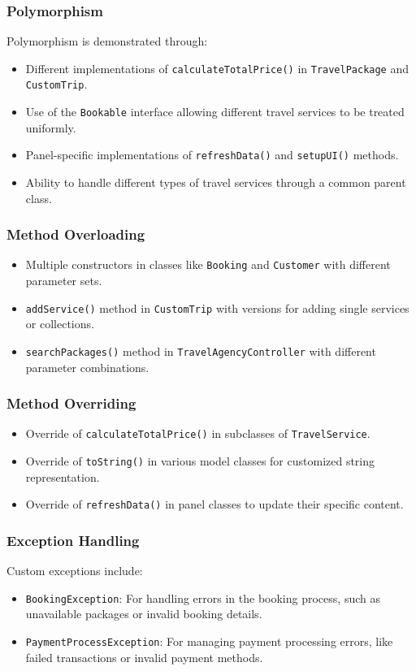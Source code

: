 \documentclass[12pt]{article}
\begin{document}
\subsubsection{Polymorphism}
Polymorphism is demonstrated through:
\begin{itemize}
    \item Different implementations of \texttt{calculateTotalPrice()} in \texttt{TravelPackage} and \texttt{CustomTrip}.
    \item Use of the \texttt{Bookable} interface allowing different travel services to be treated uniformly.
    \item Panel-specific implementations of \texttt{refreshData()} and \texttt{setupUI()} methods.
    \item Ability to handle different types of travel services through a common parent class.
\end{itemize}

\subsubsection{Method Overloading}
\begin{itemize}
    \item Multiple constructors in classes like \texttt{Booking} and \texttt{Customer} with different parameter sets.
    \item \texttt{addService()} method in \texttt{CustomTrip} with versions for adding single services or collections.
    \item \texttt{searchPackages()} method in \texttt{TravelAgencyController} with different parameter combinations.
\end{itemize}

\subsubsection{Method Overriding}
\begin{itemize}
    \item Override of \texttt{calculateTotalPrice()} in subclasses of \texttt{TravelService}.
    \item Override of \texttt{toString()} in various model classes for customized string representation.
    \item Override of \texttt{refreshData()} in panel classes to update their specific content.
\end{itemize}

\subsubsection{Exception Handling}
Custom exceptions include:
\begin{itemize}
    \item \texttt{BookingException}: For handling errors in the booking process, such as unavailable packages or invalid booking details.
    \item \texttt{PaymentProcessException}: For managing payment processing errors, like failed transactions or invalid payment methods.
\end{itemize}
\newpage
\end{document}
